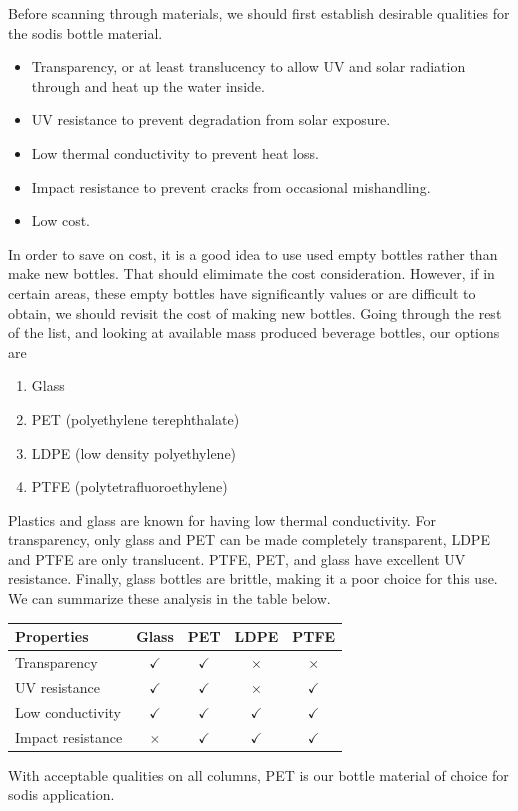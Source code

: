 \documentclass[
10pt,
a4paper,
openany,
svgnames,
]{book}
\begin{document}
\begin{solution}
  Before scanning through materials, we should first establish desirable qualities for the sodis bottle material.

  \begin{itemize}
  \item Transparency, or at least translucency to allow UV and solar radiation through and heat up the water inside.
  \item UV resistance to prevent degradation from solar exposure.
  \item Low thermal conductivity to prevent heat loss.
  \item Impact resistance to prevent cracks from occasional mishandling.
  \item Low cost.
  \end{itemize}

  In order to save on cost, it is a good idea to use used empty bottles rather than make new bottles. That should elimimate the cost consideration. However, if in certain areas, these empty bottles have significantly values or are difficult to obtain, we should revisit the cost of making new bottles. Going through the rest of the list, and looking at available mass produced beverage bottles, our options are 

  \begin{enumerate}
  \item Glass
  \item PET (polyethylene terephthalate)
  \item LDPE (low density polyethylene)
  \item PTFE (polytetrafluoroethylene)
  \end{enumerate}

  Plastics and glass are known for having low thermal conductivity. For transparency, only glass and PET can be made completely transparent, LDPE and PTFE are only translucent. PTFE, PET, and glass have excellent UV resistance. Finally, glass bottles are brittle, making it a poor choice for this use. We can summarize these analysis in the table below.

  \begin{table}[H]
    \centering
    \begin{tabular}{lcccc}
      \toprule
      Properties & Glass & PET & LDPE & PTFE \\
      \midrule
      Transparency & $\checkmark$ & $\checkmark$ & $\times$ & $\times$ \\
      UV resistance & $\checkmark$ & $\checkmark$ & $\times$ & $\checkmark$ \\
      Low conductivity & $\checkmark$ & $\checkmark$ & $\checkmark$ & $\checkmark$ \\
      Impact resistance & $\times$ & $\checkmark$ & $\checkmark$ & $\checkmark$ \\
      \bottomrule
    \end{tabular}
  \end{table} 

  With acceptable qualities on all columns, PET is our bottle material of choice for sodis application.
\end{solution}
\end{document}
